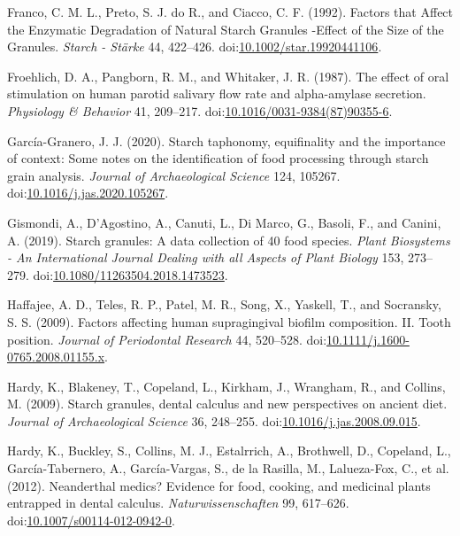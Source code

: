 \documentclass[utf8]{../templates/frontiersSCNS}
\newlength{\cslhangindent}
\newlength{\cslentryspacingunit} %
\newenvironment{CSLReferences}[2] %
 {%
  \setlength{\parindent}{0pt}
  \ifodd #1
  \let\oldpar\par
  \def\par{\hangindent=\cslhangindent\oldpar}
  \fi
  \setlength{\parskip}{#2\cslentryspacingunit}
 }%
 {}
\begin{document}
\begin{CSLReferences}{1}{0}
\leavevmode{}%
Franco, C. M. L., Preto, S. J. do R., and Ciacco, C. F. (1992). Factors that {Affect} the {Enzymatic Degradation} of {Natural Starch Granules} -{Effect} of the {Size} of the {Granules}. \emph{Starch - Stärke} 44, 422--426. doi:\href{https://doi.org/10.1002/star.19920441106}{10.1002/star.19920441106}.

\leavevmode{}%
Froehlich, D. A., Pangborn, R. M., and Whitaker, J. R. (1987). The effect of oral stimulation on human parotid salivary flow rate and alpha-amylase secretion. \emph{Physiology \& Behavior} 41, 209--217. doi:\href{https://doi.org/10.1016/0031-9384(87)90355-6}{10.1016/0031-9384(87)90355-6}.

\leavevmode{}%
García-Granero, J. J. (2020). Starch taphonomy, equifinality and the importance of context: {Some} notes on the identification of food processing through starch grain analysis. \emph{Journal of Archaeological Science} 124, 105267. doi:\href{https://doi.org/10.1016/j.jas.2020.105267}{10.1016/j.jas.2020.105267}.

\leavevmode{}%
Gismondi, A., D'Agostino, A., Canuti, L., Di Marco, G., Basoli, F., and Canini, A. (2019). Starch granules: A data collection of 40 food species. \emph{Plant Biosystems - An International Journal Dealing with all Aspects of Plant Biology} 153, 273--279. doi:\href{https://doi.org/10.1080/11263504.2018.1473523}{10.1080/11263504.2018.1473523}.

\leavevmode{}%
Haffajee, A. D., Teles, R. P., Patel, M. R., Song, X., Yaskell, T., and Socransky, S. S. (2009). Factors affecting human supragingival biofilm composition. {II}. {Tooth} position. \emph{Journal of Periodontal Research} 44, 520--528. doi:\href{https://doi.org/10.1111/j.1600-0765.2008.01155.x}{10.1111/j.1600-0765.2008.01155.x}.

\leavevmode{}%
Hardy, K., Blakeney, T., Copeland, L., Kirkham, J., Wrangham, R., and Collins, M. (2009). Starch granules, dental calculus and new perspectives on ancient diet. \emph{Journal of Archaeological Science} 36, 248--255. doi:\href{https://doi.org/10.1016/j.jas.2008.09.015}{10.1016/j.jas.2008.09.015}.

\leavevmode{}%
Hardy, K., Buckley, S., Collins, M. J., Estalrrich, A., Brothwell, D., Copeland, L., García-Tabernero, A., García-Vargas, S., de la Rasilla, M., Lalueza-Fox, C., et al. (2012). Neanderthal medics? {Evidence} for food, cooking, and medicinal plants entrapped in dental calculus. \emph{Naturwissenschaften} 99, 617--626. doi:\href{https://doi.org/10.1007/s00114-012-0942-0}{10.1007/s00114-012-0942-0}.


\end{CSLReferences}
\end{document}
